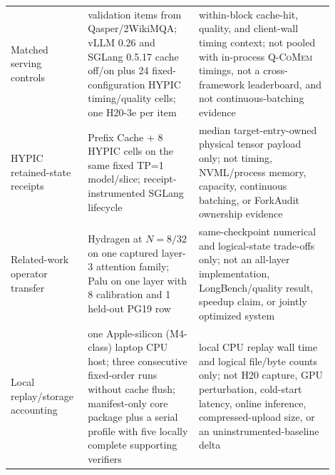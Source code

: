 \documentclass{article}
\newcommand{\qcomem}{\textsc{Q-CoMem}}
\begin{document}
\begin{longtable}{@{}>{\raggedright\arraybackslash}p{0.19\linewidth}>{\raggedright\arraybackslash}p{0.32\linewidth}>{\raggedright\arraybackslash}p{0.39\linewidth}@{}}
  Matched serving controls & 8 validation items from Qasper/2WikiMQA; vLLM 0.26 and SGLang 0.5.17 cache off/on plus 24 fixed-configuration HYPIC timing/quality cells; one H20-3e per item & within-block cache-hit, quality, and client-wall timing context; not pooled with in-process \qcomem{} timings, not a cross-framework leaderboard, and not continuous-batching evidence \\
  HYPIC retained-state receipts & 8 Prefix Cache + 8 HYPIC cells on the same fixed TP=1 model/slice; receipt-instrumented SGLang lifecycle & median target-entry-owned physical tensor payload only; not timing, NVML/process memory, capacity, continuous batching, or ForkAudit ownership evidence \\
  Related-work operator transfer & Hydragen at $N=8/32$ on one captured layer-3 attention family; Palu on one layer with 8 calibration and 1 held-out PG19 row & same-checkpoint numerical and logical-state trade-offs only; not an all-layer implementation, LongBench/quality result, speedup claim, or jointly optimized system \\
  Local replay/storage accounting & one Apple-silicon (M4-class) laptop CPU host; three consecutive fixed-order runs without cache flush; manifest-only core package plus a serial profile with five locally complete supporting verifiers & local CPU replay wall time and logical file/byte counts only; not H20 capture, GPU perturbation, cold-start latency, online inference, compressed-upload size, or an uninstrumented-baseline delta \\
\end{longtable}
\endgroup


\end{document}
